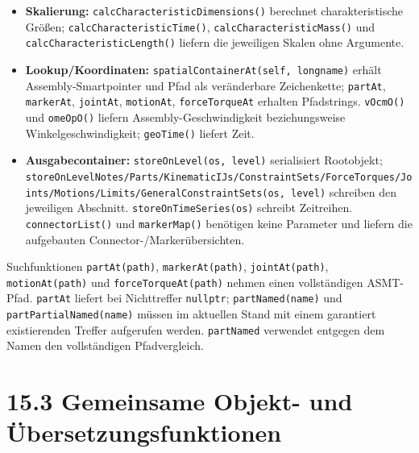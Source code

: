 \documentclass[
  12pt
]{book}
\begin{document}
\begin{itemize}
  \texttt{runPostDrag()} führen Dragphasen aus; \texttt{restorePosRot()}
  stellt gespeicherte Lagen wieder her;
  \texttt{initprincipalMassMarker()} initialisiert den
  Assembly-Massemarker. \texttt{updateFromMbD()},
  \texttt{updateForFrame(index)}, \texttt{compareResults(type)} und
  \texttt{outputResults(type)} übernehmen Zustand, Frame oder
  Analyseart.
\item
  \textbf{Skalierung:} \texttt{calcCharacteristicDimensions()} berechnet
  charakteristische Größen; \texttt{calcCharacteristicTime()},
  \texttt{calcCharacteristicMass()} und
  \texttt{calcCharacteristicLength()} liefern die jeweiligen Skalen ohne
  Argumente.
\item
  \textbf{Lookup/Koordinaten:}
  \texttt{spatialContainerAt(self,\ longname)} erhält
  Assembly-Smartpointer und Pfad als veränderbare Zeichenkette;
  \texttt{partAt}, \texttt{markerAt}, \texttt{jointAt},
  \texttt{motionAt}, \texttt{forceTorqueAt} erhalten Pfadstrings.
  \texttt{vOcmO()} und \texttt{omeOpO()} liefern
  Assembly-Geschwindigkeit beziehungsweise Winkelgeschwindigkeit;
  \texttt{geoTime()} liefert Zeit.
\item
  \textbf{Ausgabecontainer:} \texttt{storeOnLevel(os,\ level)}
  serialisiert Rootobjekt;
  \texttt{storeOnLevelNotes/Parts/KinematicIJs/ConstraintSets/ForceTorques/Joints/Motions/Limits/GeneralConstraintSets(os,\ level)}
  schreiben den jeweiligen Abschnitt. \texttt{storeOnTimeSeries(os)}
  schreibt Zeitreihen. \texttt{connectorList()} und \texttt{markerMap()}
  benötigen keine Parameter und liefern die aufgebauten
  Connector-/Markerübersichten.
\end{itemize}

Suchfunktionen \texttt{partAt(path)}, \texttt{markerAt(path)},
\texttt{jointAt(path)}, \texttt{motionAt(path)} und
\texttt{forceTorqueAt(path)} nehmen einen vollständigen ASMT-Pfad.
\texttt{partAt} liefert bei Nichttreffer \texttt{nullptr};
\texttt{partNamed(name)} und \texttt{partPartialNamed(name)} müssen im
aktuellen Stand mit einem garantiert existierenden Treffer aufgerufen
werden. \texttt{partNamed} verwendet entgegen dem Namen den
vollständigen Pfadvergleich.

\hypertarget{abs-api-gemeinsame-funktionen}{%
\section{\texorpdfstring{{15.3} Gemeinsame Objekt- und
Übersetzungsfunktionen}{15.3 Gemeinsame Objekt- und Übersetzungsfunktionen}}\label{abs-api-gemeinsame-funktionen}}
\end{document}
